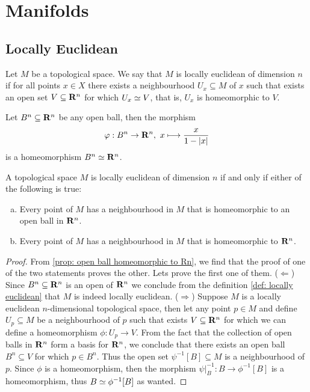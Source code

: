 \section{Manifolds}

\subsection{Locally Euclidean}

\begin{definition}\label{def: locally euclidean}
  Let \(M\) be a topological space. We say that \(M \) is locally euclidean of
  dimension \(n\) if for all points \(x \in X\) there exists a neighbourhood
  \(U_x \subseteq M\) of \(x\) such that exists an open set \(V \subseteq
  \mathbf{R}^n\) for which \(U_x \simeq V\), that is, \(U_x\) is homeomorphic to
  \(V\).
\end{definition}

\begin{proposition}\label{prop: open ball homeomorphic to Rn}
  Let \(B^n \subseteq \mathbf{R}^n\) be any open ball, then the morphism
  \[
    \varphi: B^n \to \mathbf{R}^n,\ x \longmapsto \frac{x}{1 - |x|}
  \]
  is a homeomorphism \(B^n \simeq \mathbf{R}^n\).
\end{proposition}

\begin{lemma}
  A topological space \(M\) is locally euclidean of dimension \(n\) if and only
  if either of the following is true:
  \begin{enumerate}[(a)]
    \item Every point of \(M\) has a neighbourhood in \(M\) that is homeomorphic
      to an open ball in \(\mathbf{R}^n\).
    \item Every point of \(M\) has a neighbourhood in \(M\) that is homeomorphic
      to \(\mathbf{R}^n\).
  \end{enumerate}
\end{lemma}

\begin{proof}
  From \cref{prop: open ball homeomorphic to Rn}, we find that the proof of one
  of the two statements proves the other. Lets prove the first one of them.
  (\(\Leftarrow\)) Since \(B^n \subseteq \mathbf{R}^n\) is an open of
  \(\mathbf{R}^n\) we conclude from the definition \cref{def: locally euclidean}
  that \(M\) is indeed locally euclidean.
  (\(\Rightarrow\)) Suppose \(M\) is a locally euclidean \(n\)-dimensional
  topological space, then let any point \(p \in M\) and define \(U_p \subseteq
  M\) be a neighbourhood of \(p\) such that exists \(V \subseteq \mathbf{R}^n\)
  for which we can define a homeomorphism \(\phi : U_p \to V\). From the fact
  that the collection of open balls in \(\mathbf{R}^n\) form a basis for
  \(\mathbf{R}^n\), we conclude that there exists an open ball \(B^n \subseteq
  V\) for which \(p \in B^n\). Thus the open set \(\psi^{-1}[B] \subseteq M\) is
  a neighbourhood of \(p\). Since \(\phi\) is a homeomorphism, then the
  morphism \(\psi|_B^{-1} : B \to \phi^{-1}[B]\) is a homeomorphism, thus \(B
  \simeq \phi^{-1}[B]\) as wanted.
\end{proof}

